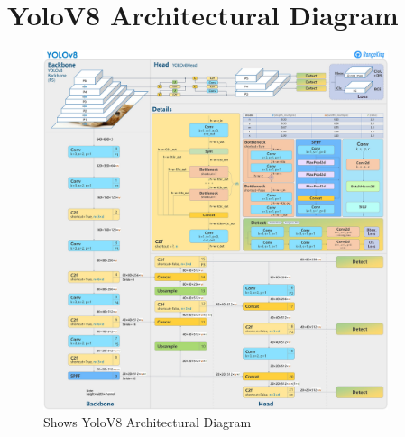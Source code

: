 \documentclass[12 pt]{report}
\begin{document}
\section{YoloV8 Architectural Diagram}
\begin{figure}[h]
  \centering
  \includegraphics[width=0.9\textwidth]{Yolov8_Arch.png}%
  \caption{Shows YoloV8 Architectural Diagram}
  \label{fig:function_block_diagram}
\end{figure}
\end{document}
